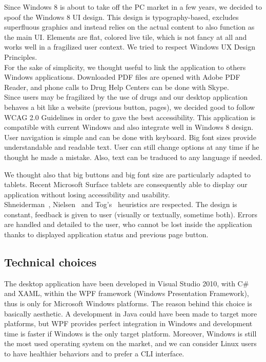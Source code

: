 \documentclass[a4paper,12pt, twocolumn]{article}
\begin{document}
Since Windows 8 is about to take off the PC market in a few years, we decided to spoof the Windows 8 UI design. This design is typography-based, excludes superfluous graphics and instead relies on the actual content to also function as the main UI. Elements are flat, colored live tile, which is not fancy at all and works well in a fragilized user context. We tried to respect Windows UX Design Principles\cite{windowsux}.\\

For the sake of simplicity, we thought useful to link the application to others Windows applications. Downloaded PDF files are opened with Adobe PDF Reader, and phone calls to Drug Help Centers can be done with Skype.\\

Since users may be fragilized by the use of drugs and our desktop application behaves a bit like a website (previous button, pages), we decided good to follow WCAG 2.0 Guidelines in order to gave the best accessibility\cite{wcag}. This application is compatible with current Windows and also integrate well in Windows 8 design. User navigation is simple and can be done with keyboard. Big font sizes provide understandable and readable text. User can still change options at any time if he thought he made a mistake. Also, text can be traduced to any language if needed.

We thought also that big buttons and big font size are particularly adapted to tablets. Recent Microsoft Surface tablets are consequently able to display our application without losing accessibility and usability.\\

Shneiderman~\cite{shneiderman05}, Nielsen~\cite{nielsen94} and Tog's~\cite{tognazzini03} heuristics are respected. The design is constant, feedback is given to user (visually or textually, sometime both). Errors are handled and detailed to the user, who cannot be lost inside the application thanks to displayed application status and previous page button.

\subsection*{Technical choices}

The desktop application have been developed in Visual Studio 2010, with C\# and XAML, within the WPF framework (Windows Presentation Framework), thus is only for Microsoft Windows platforms. The reason behind this choice is basically aesthetic. A development in Java could have been made to target more platforms, but WPF provides perfect integration in Windows and development time is faster if Windows is the only target platform. Moreover, Windows is still the most used operating system on the market, and we can consider Linux users to have healthier behaviors and to prefer a CLI interface.\\
\end{document}
